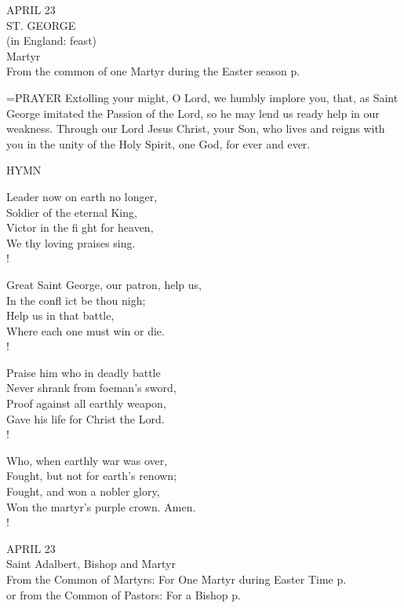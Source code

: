 \begin{center}\normalsize APRIL 23\\
\footnotesize ST. GEORGE\\
\footnotesize (in England: feast)\\
\footnotesize Martyr\\
\footnotesize From the common of one Martyr during the Easter season p. \\
\end{center}

\hangindent=\parindent \small{PRAYER 
Extolling your might, O Lord,
we humbly implore you,
that, as Saint George imitated the Passion of the Lord,
so he may lend us ready help in our weakness.
Through our Lord Jesus Christ, your Son,
who lives and reigns with you in the unity of the Holy Spirit,
one God, for ever and ever.\\}
 
\noindent\small{\uppercase{Hymn}}\normalsize\label{proper:george:hymn}
\begin{cverse}
Leader now on earth no longer,\\
Soldier of the eternal King,\\
Victor in the fi ght for heaven,\\
We thy loving praises sing.\\!

Great Saint George, our patron, help us,\\
In the confl ict be thou nigh;\\
Help us in that battle,\\
Where each one must win or die.\\!

Praise him who in deadly battle\\
Never shrank from foeman’s sword,\\
Proof against all earthly weapon,\\
Gave his life for Christ the Lord.\\!

Who, when earthly war was over,\\
Fought, but not for earth’s renown;\\
Fought, and won a nobler glory,\\
Won the martyr’s purple crown. Amen.\\!
\end{cverse}

\begin{center}\normalsize APRIL 23\\
\footnotesize Saint Adalbert, Bishop and Martyr\\
\footnotesize From the Common of Martyrs: For One Martyr during Easter Time p.   \\
\footnotesize or  from the Common of Pastors: For a Bishop p.    \\
\end{center}

